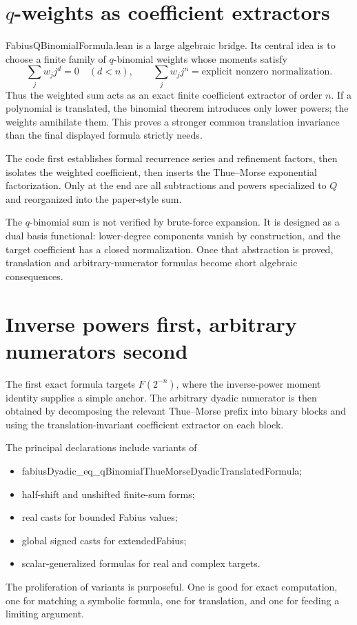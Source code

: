 \documentclass[11pt,a4paper,openany]{book}
\def\module#1{#1.lean}
\def\decl#1{#1}
\def\Q{Q}
\newcommand{\Q}{\ensuremath{\mathbb{Q}}}
\newcommand{\module}[1]{\nolinkurl{#1.lean}}
\newcommand{\decl}[1]{\texttt{\detokenize{#1}}}
\begin{document}
\section{\texorpdfstring{$q$-weights}{q-weights} as coefficient extractors}
\module{FabiusQBinomialFormula} is a large algebraic bridge.  Its central idea
is to choose a finite family of $q$-binomial weights whose moments satisfy
\[
 \sum_j w_j j^d=0\quad(d<n),
 \qquad
 \sum_j w_j j^n=\text{explicit nonzero normalization}.
\]
Thus the weighted sum acts as an exact finite coefficient extractor of order
$n$.  If a polynomial is translated, the binomial theorem introduces only
lower powers; the weights annihilate them.  This proves a stronger common
translation invariance than the final displayed formula strictly needs.

The code first establishes formal recurrence series and refinement factors,
then isolates the weighted coefficient, then inserts the Thue--Morse
exponential factorization.  Only at the end are all subtractions and powers
specialized to $\Q$ and reorganized into the paper-style sum.

\begin{proofidea}
The $q$-binomial sum is not verified by brute-force expansion.  It is designed
as a dual basis functional: lower-degree components vanish by construction,
and the target coefficient has a closed normalization.  Once that abstraction
is proved, translation and arbitrary-numerator formulas become short algebraic
consequences.
\end{proofidea}

\section{Inverse powers first, arbitrary numerators second}
The first exact formula targets $F(2^{-n})$, where the inverse-power moment
identity supplies a simple anchor.  The arbitrary dyadic numerator is then
obtained by decomposing the relevant Thue--Morse prefix into binary blocks and
using the translation-invariant coefficient extractor on each block.

The principal declarations include variants of
\begin{itemize}
  \item \decl{fabiusDyadic_eq_qBinomialThueMorseDyadicTranslatedFormula};
  \item half-shift and unshifted finite-sum forms;
  \item real casts for bounded Fabius values;
  \item global signed casts for \decl{extendedFabius};
  \item scalar-generalized formulas for real and complex targets.
\end{itemize}
The proliferation of variants is purposeful.  One is good for exact
computation, one for matching a symbolic formula, one for translation, and one
for feeding a limiting argument.
\end{document}
